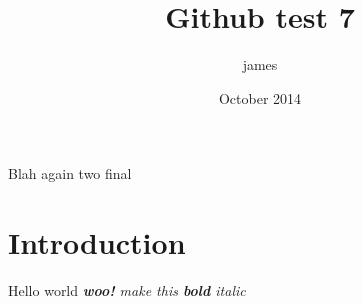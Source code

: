 \documentclass{article}
\title{Github test 7}
\author{james }
\date{October 2014}
\begin{document}
\maketitle

Blah again two final

\section{Introduction}

Hello world \textit{\textbf{woo!} make this \textbf{bold} \textit{italic}}
\end{document}
